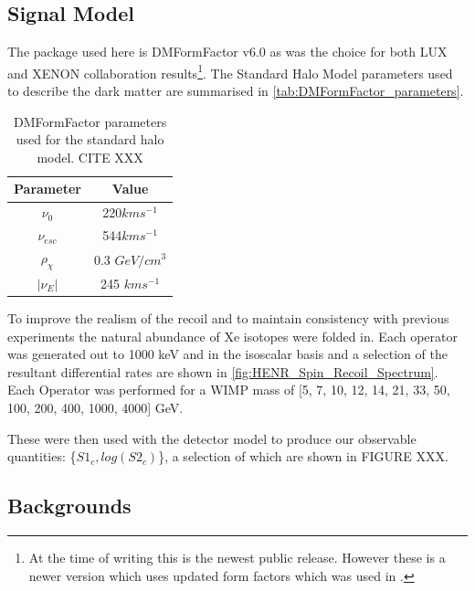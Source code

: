 \subsection{Signal Model}
\par
The package used here is DMFormFactor v6.0 as was the choice for both LUX and XENON collaboration results\footnote{At the time of writing this is the newest public release. However these is a newer version which uses updated form factors which was used in \cite{pandax_2_eft_ref}.}.
The Standard Halo Model parameters used to describe the dark matter are summarised in \autoref{tab:DMFormFactor_parameters}.
\begin{table}[]
    \centering
    \begin{tabular}{c|c}
        Parameter         & Value  \\ \hline
        $\nu_0$           & 220$km s^{-1}$ \\
        $\nu_{esc}$       & 544$km s^{-1}$ \\
        $\rho_{\chi}$     & 0.3 $GeV/cm^{3}$ \\
        $|\nu_E|$         & 245 $km s^{-1}$ 
    \end{tabular}
    \caption{DMFormFactor parameters used for the standard halo model. CITE XXX}
    \label{tab:DMFormFactor_parameters}
\end{table}
To improve the realism of the recoil and to maintain consistency with previous experiments the natural abundance of Xe isotopes were folded in.
Each operator was generated out to 1000 keV and in the isoscalar basis and a selection of the resultant differential rates are shown in \autoref{fig:HENR_Spin_Recoil_Spectrum}.
Each Operator was performed for a WIMP mass of [5, 7, 10, 12, 14, 21, 33, 50, 100, 200, 400, 1000, 4000] GeV.



\par
These were then used with the detector model to produce our observable quantities: \{$S1_c,log(S2_c)$\}, a selection of which are shown in FIGURE XXX.




\subsection{Backgrounds}




